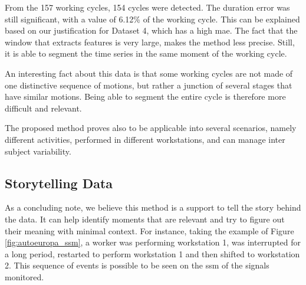 From the 157 working cycles, 154 cycles were detected. The duration error was still significant, with a value of 6.12\% of the working cycle. This can be explained based on our justification for Dataset 4, which has a high \gls{mae}. The fact that the window that extracts features is very large, makes the method less precise. Still, it is able to segment the time series in the same moment of the working cycle.
\par
An interesting fact about this data is that some working cycles are not made of one distinctive sequence of motions, but rather a junction of several stages that have similar motions. Being able to segment the entire cycle is therefore more difficult and relevant.
\par
The proposed method proves also to be applicable into several scenarios, namely different activities, performed in different workstations, and can manage inter subject variability.

\subsection{Storytelling Data}

As a concluding note, we believe this method is a support to tell the story behind the data. It can help identify moments that are relevant and try to figure out their meaning with minimal context. For instance, taking the example of Figure \ref{fig:autoeuropa_ssm}, a worker was performing workstation 1, was interrupted for a long period, restarted to perform workstation 1 and then shifted to workstation 2. This sequence of events is possible to be seen on the \gls{ssm} of the signals monitored.





%
%

